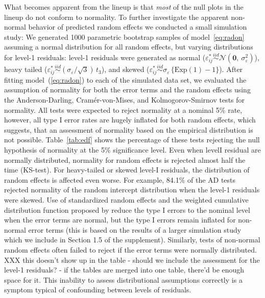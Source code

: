 \documentclass[12pt]{article} %
\newcommand{\hh}[1]{{\color{orange} #1}}
\newcommand{\al}[1]{{\color{red} #1}}
\begin{document}
What becomes apparent from the lineup is that {\it most} of the null plots in the lineup do not conform to normality. To further investigate the apparent non-normal behavior of predicted random effects we conducted a small simulation study: 
%
We generated 1000 parametric bootstrap samples of model~\eqref{eq:radon} assuming \hh{a normal distribution for all random effects, but  varying distributions for  level-1 residuals: } level-1 residuals were generated as normal ($\varepsilon_{ij}^* \overset{iid}{\sim}  \mathcal{N}(\bm{0},\ \sigma^2_\varepsilon)$), heavy tailed ($\varepsilon_{ij}^* \overset{iid}{\sim} (\sigma_{\varepsilon} / \sqrt{3})\, t_3$), and skewed ($\varepsilon_{ij}^* \overset{iid}{\sim} \sigma_{\varepsilon} \, \{ \text{Exp}(1) - 1 \}$).
After fitting model~(\ref{eq:radon}) to each of the simulated data set, we evaluated the assumption of normality for both the error terms and 
the random effects using the Anderson-Darling, Cram{\'e}r-von-Mises, and  Kolmogorov-Smirnov tests for normality.  All tests were expected to reject normality at a nominal 5\% rate, however, all type I error rates are hugely inflated for both random effects, which suggests, that  an assessment of normality based on the empirical distribution is not possible. 
%
Table~\ref{tab:edf} shows the percentage of these tests rejecting the null hypothesis of normality at the 5\% significance level.
Even when levelI residual are normally distributed, normality for random effects is rejected almost half the time (KS-test). For heavy-tailed or skewed level-I residuals, the distribution of random effects is affected even worse. 
%
For example, 84.1\% of the AD tests rejected normality of the random intercept distribution when the level-1 residuals were skewed.
 Use of standardized random effects and the weighted cumulative distribution function proposed by \cite{Lange:1989uu} reduce the type I errors to the nominal level when the error terms are normal, but the type I errors remain inflated for non-normal error terms \al{(this is based on the results of a larger simulation study which we include in Section 1.5 of the supplement)}.  
Similarly, tests of non-normal random effects often failed to reject if the error terms were normally distributed. \hh{XXX this doesn't show up in the table - should we include the assessment for the level-1 residuals? - if the tables are merged into one table, there'd be enough space for it.}
This inability to assess distributional assumptions correctly is a symptom typical of confounding between levels of residuals.
\end{document}
